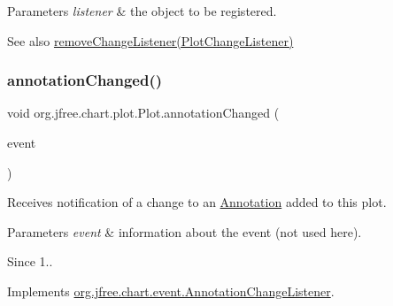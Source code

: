 \begin{DoxyParams}{Parameters}
{\em listener} & the object to be registered.\\
\hline
\end{DoxyParams}
\begin{DoxySeeAlso}{See also}
\mbox{\hyperlink{classorg_1_1jfree_1_1chart_1_1plot_1_1_plot_a22b9d9efffe33edd36a3b7999ee5e1fd}{remove\+Change\+Listener(\+Plot\+Change\+Listener)}} 
\end{DoxySeeAlso}
\mbox{\label{classorg_1_1jfree_1_1chart_1_1plot_1_1_plot_a924668be492b2c151c1de74b3cd73f58}} 
\subsubsection{\texorpdfstring{annotation\+Changed()}{annotationChanged()}}
{\footnotesize\ttfamily void org.\+jfree.\+chart.\+plot.\+Plot.\+annotation\+Changed (\begin{DoxyParamCaption}\item[{\mbox{\hyperlink{classorg_1_1jfree_1_1chart_1_1event_1_1_annotation_change_event}{Annotation\+Change\+Event}}}]{event }\end{DoxyParamCaption})}

Receives notification of a change to an \mbox{\hyperlink{}{Annotation}} added to this plot.


\begin{DoxyParams}{Parameters}
{\em event} & information about the event (not used here).\\
\hline
\end{DoxyParams}
\begin{DoxySince}{Since}
1.. 
\end{DoxySince}


Implements \mbox{\hyperlink{interfaceorg_1_1jfree_1_1chart_1_1event_1_1_annotation_change_listener_ac7367f136960e9a914a759b69595c535}{org.\+jfree.\+chart.\+event.\+Annotation\+Change\+Listener}}.

\mbox{\label{classorg_1_1jfree_1_1chart_1_1plot_1_1_plot_ab4541100d154f3585628f3d57fd9957d}} 
